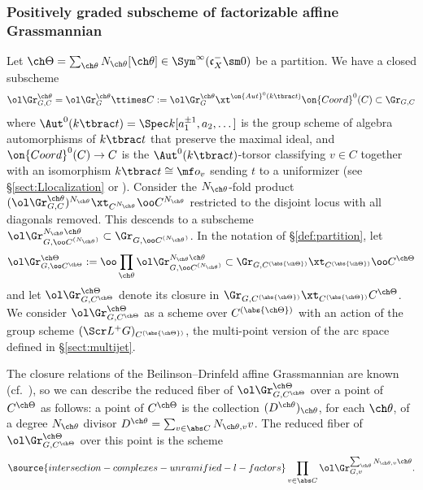 \subsubsection{Positively graded subscheme of factorizable affine Grassmannian}\label{sect:strata-Grassmannian}
Let $\ch\Theta = \sum_{\ch\theta} N_{\ch\theta}
[\ch\theta] \in \Sym^\infty(\mathfrak c_X^- \sm 0)$
be a partition. We have a closed
subscheme
\[ \ol\Gr^{\ch\theta}_{G,C} = \ol\Gr_G^{\ch\theta} \ttimes C := \ol\Gr_G^{\ch\theta} \xt^{\on{Aut}^0( k\tbrac t )} \on{Coord}^0(C) \subset \Gr_{G,C} \]
where $\Aut^0(k\tbrac t) = \Spec k[a_1^{\pm 1}, a_2,\dotsc]$ is the group scheme of algebra automorphisms of $k\tbrac t$ that preserve the maximal ideal, and $\on{Coord}^0(C)\to C$ is the $\Aut^0(k\tbrac t)$-torsor classifying $v\in C$ together with an isomorphism $k\tbrac t \cong \mf o_v$ sending $t$ to a uniformizer
(see \S\ref{sect:Llocalization} or \cite[(3.1.11)]{Xinwen}).
Consider the $N_{\ch\theta}$-fold product $(\ol\Gr_{G,C}^{\ch\theta})^{N_{\ch\theta}} \xt_{C^{N_{\ch\theta}}} {\oo C^{N_{\ch\theta}}}$ restricted to the disjoint locus with all diagonals removed.
This descends to a subscheme $\ol\Gr^{N_{\ch\theta}\ch\theta}_{G, \oo C^{(N_{\ch\theta})}} \subset \Gr_{G, \oo C^{(N_{\ch\theta})}}$.
In the notation of \S\ref{def:partition}, let
\[ \ol\Gr^{\ch\Theta}_{G, \oo C^{\ch\Theta}} := \oo\prod_{\ch\theta} \ol\Gr^{N_{\ch\theta}\ch\theta}_{G, \oo C^{(N_{\ch\theta})}}
\subset \Gr_{G, C^{(\abs{\ch\Theta})}} \xt_{C^{(\abs{\ch\Theta})}}
\oo C^{\ch\Theta} \]
and let $\ol\Gr^{\ch\Theta}_{G,C^{\ch\Theta}}$ denote its closure
in $\Gr_{G,C^{(\abs{\ch\Theta})}} \xt_{C^{(\abs{\ch\Theta})}} C^{\ch\Theta}$.
We consider $\ol\Gr^{\ch\Theta}_{G, C^{\ch\Theta}}$ as a scheme
over $C^{(\abs{\ch\Theta})}$ with an action of the group scheme
$(\Scr L^+ G)_{C^{(\abs{\ch\Theta})}}$, the multi-point version of the arc space
defined in \S\ref{sect:multijet}.



The closure relations of the Beilinson--Drinfeld affine Grassmannian
are known (cf.~\cite[Proposition 3.1.14]{Xinwen}), so we can describe
the reduced fiber of $\ol\Gr^{\ch\Theta}_{G,C^{\ch\Theta}}$
over a point of $C^{\ch\Theta}$ as follows:
a point of $C^{\ch\Theta}$ is the collection $(D^{\ch\theta})_{\ch\theta}$,
for each $\ch\theta$,
of a degree $N_{\ch\theta}$ divisor
$D^{\ch\theta} = \sum_{v\in \abs C} N_{\ch\theta,v} v$.
The reduced fiber of $\ol\Gr^{\ch\Theta}_{G,C^{\ch\Theta}}$
over this point is the scheme
\begin{equation} \label{e:GrTheta-fiber}
\source{intersection-complexes-unramified-l-factors}
\prod_{v\in \abs C} \ol\Gr^{\sum_{\ch\theta} N_{\ch\theta,v}\ch\theta}_{G,v}.
\end{equation}


